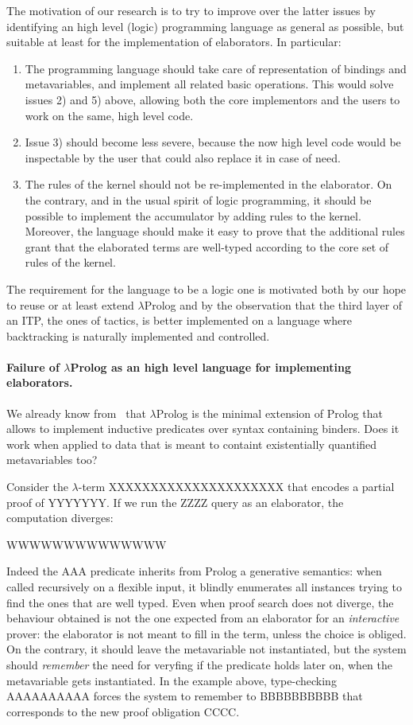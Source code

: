 \documentclass{easychair}
\begin{document}
The motivation of our research is to try to improve over the latter
issues by identifying an high level (logic) programming language as
general as possible, but suitable at least for the implementation of
elaborators. In particular:
\begin{enumerate}
\item The programming language should take care of representation of
	bindings and metavariables, and implement all related basic
	operations. This would solve issues 2) and 5) above, allowing
	both the core implementors and the users to work on the same,
	high level code.
\item Issue 3) should become less severe, because the now high level
	code would be inspectable by the user that could also replace
	it in case of need.
\item The rules of the kernel should not be re-implemented in the
	elaborator. On the contrary, and in the usual spirit of logic
	programming, it should be possible to implement the
	accumulator by adding rules to the kernel. Moreover, the
	language should make it easy to prove that the additional
	rules grant that the elaborated terms are well-typed according
	to the core set of rules of the kernel.
\end{enumerate}

The requirement for the language to be a logic one is motivated both
by our hope to reuse or at least extend $\lambda$Prolog and by the
observation that the third layer of an ITP, the ones of tactics, is
better implemented on a language where backtracking is naturally
implemented and controlled.

\paragraph{Failure of $\lambda$Prolog as an high level language for
implementing elaborators.}
We already know from~\cite{jlp98} that $\lambda$Prolog is the minimal
extension of Prolog that allows to implement inductive predicates over
syntax containing binders. Does it work when applied to data that is
meant to containt existentially quantified metavariables too?

Consider the $\lambda$-term XXXXXXXXXXXXXXXXXXXXX that encodes a partial proof of YYYYYYY. If we run the ZZZZ query as an elaborator, the computation diverges:

WWWWWWWWWWWWWW

Indeed the AAA predicate inherits from Prolog a generative semantics:
when called recursively on a flexible input, it blindly enumerates all
instances trying to find the ones that are well typed. Even when proof
search does not diverge, the behaviour obtained is not the one
expected from an elaborator for an \emph{interactive} prover: the
elaborator is not meant to fill in the term, unless the choice is
obliged. On the contrary, it should leave the metavariable not
instantiated, but the system should \emph{remember} the need for
veryfing if the predicate holds later on, when the metavariable gets
instantiated. In the example above, type-checking AAAAAAAAAA forces
the system to remember to BBBBBBBBBB that corresponds to the new proof
obligation CCCC.
\end{document}
